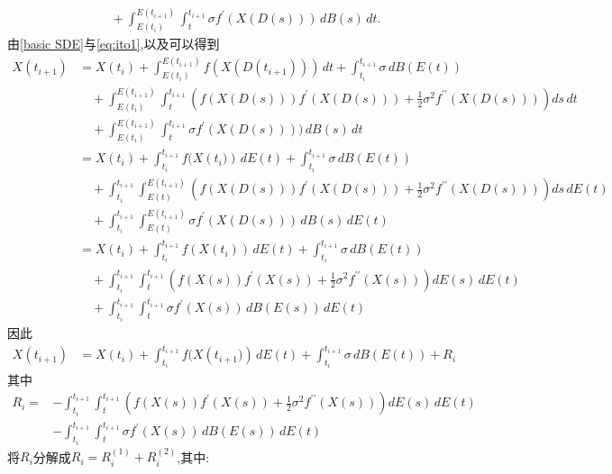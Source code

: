 \documentclass[12pt,final]{article}
\makeatletter
\theoremstyle{plain}
\renewcommand{\proofname}{Proof}
\theoremstyle{Definition}
\theoremstyle{Remark}
\renewenvironment{proof}[1][\proofname]{\par
	\pushQED{\qed}%
	\normalfont \topsep6\p@\@plus6\p@\relax
	\trivlist\item[\hskip\labelsep
	\bfseries #1\@addpunct{\,:\,}]\ignorespaces
}{%
	\popQED\endtrivlist\@endpefalse
}
\makeatother
\begin{document}
\begin{proof}
\begin{equation}
\begin{aligned}
				&\quad + \int_{E(t_i)}^{E(t_{i+1})} \int_{t}^{t_{i+1}} \sigma f^{\prime}(X(D(s))) \, dB(s) \, dt .
			\end{aligned}
		\end{equation}
		由\cref{basic SDE}与\cref{eq:ito1},以及\cite[Theorem 3.1]{kobayashi2011stochastic}可以得到
		\begin{align*}
			X(t_{i+1}) 
			&= X(t_i) + \int_{E(t_i)}^{E(t_{i+1})} f(X({D(t_{i+1})})) \, dt + \int_{t_i}^{t_{i+1}} \sigma \, dB(E(t)) \\
			&\quad + \int_{E(t_i)}^{E(t_{i+1})} \int_{t}^{t_{i+1}}\left( f(X(D(s))) f^{\prime}(X(D(s))) + \frac{1}{2} \sigma^2 f^{\prime\prime}(X(D(s))) \right) ds \, dt \\
			&\quad + \int_{E(t_i)}^{E(t_{i+1})} \int_{t}^{t_{i+1}}\sigma f^{\prime}(X(D(s)))) \, dB(s) \, dt \\
			&= X(t_i) + \int_{t_i}^{t_{i+1}} f(X({t_i)}) \, dE(t) + \int_{t_i}^{t_{i+1}} \sigma \, dB(E(t)) \\
			&\quad + \int_{t_i}^{t_{i+1}} \int_{E(t)}^{E(t_{i+1})} \left( f(X(D(s))) f^{\prime}(X(D(s))) + \frac{1}{2} \sigma^2 f^{\prime\prime}(X(D(s))) \right) ds \, dE(t) \\
			&\quad + \int_{t_i}^{t_{i+1}} \int_{E(t)}^{E(t_{i+1})}\sigma f^{\prime}(X(D(s))) \, dB(s) \, dE(t)\\
			&= X(t_i) + \int_{t_i}^{t_{i+1}} f(X({t_i})) \, dE(t) + \int_{t_i}^{t_{i+1}} \sigma \, dB(E(t)) \\
			&\quad + \int_{t_i}^{t_{i+1}} \int_{t}^{t_{i+1}} \left( f(X(s)) f^{\prime}(X(s)) + \frac{1}{2} \sigma^2 f^{\prime\prime}(X(s)) \right) dE(s) \, dE(t) \\
			&\quad + \int_{t_i}^{t_{i+1}} \int_{t}^{t_{i+1}}\sigma f^{\prime}(X(s)) \, dB(E(s)) \, dE(t)
		\end{align*}
		因此
		\begin{align}\label{eq:2}
			X(t_{i+1})
			&= X(t_i) + \int_{t_i}^{t_{i+1}} f(X({t_{i+1})}) \, dE(t) + \int_{t_i}^{t_{i+1}} \sigma \, dB(E(t)) + R_i
		\end{align}
		其中
		\begin{align*}
			R_i = &-\int_{t_i}^{t_{i+1}} \int_{t}^{t_{i+1}} \left( f(X(s)) f^{\prime}(X(s)) + \frac{1}{2} \sigma^2 f^{\prime\prime}(X(s)) \right) dE(s) \, dE(t)\\
			&-\int_{t_i}^{t_{i+1}} \int_{t}^{t_{i+1}} \sigma f^{\prime}(X(s)) \, dB(E(s)) \, dE(t)
		\end{align*}
		将$R_i$分解成$R_i = R_i^{(1)} + R_i^{(2)}$,其中:
		\begin{align*}

\end{align*}
\end{proof}
\end{document}
